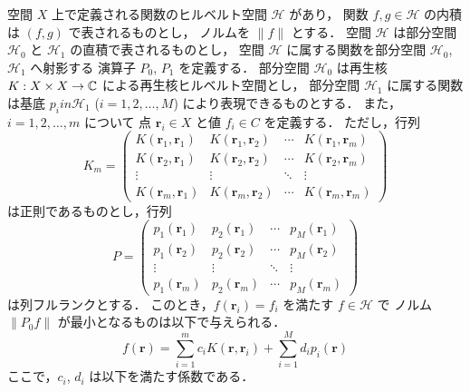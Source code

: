 \begin{theorem}
    空間 $X$ 上で定義される関数のヒルベルト空間 $\mathcal{H}$ があり，
    関数 $f, g \in \mathcal{H}$ の内積は $(f, g)$ で表されるものとし，
    ノルムを $\|f\|$ とする．
    空間 $\mathcal{H}$ は部分空間 $\mathcal{H}_0$ と $\mathcal{H}_1$ の直積で表されるものとし，
    空間 $\mathcal{H}$ に属する関数を部分空間 $\mathcal{H}_0$, $\mathcal{H}_1$ へ射影する
    演算子 $P_0$, $P_1$ を定義する．
    部分空間 $\mathcal{H}_0$ は再生核 $K : X \times X \to \mathbb{C}$ による再生核ヒルベルト空間とし，
    部分空間 $\mathcal{H}_1$ に属する関数は基底 $p_i in \mathcal{H}_1$ ($i = 1, 2, \ldots, M$)
    により表現できるものとする．
    また，$i = 1, 2, \ldots, m$ について
    点 $\bm{r}_i \in X$ と値 $f_i \in C$ を定義する．
    ただし，行列
    \begin{equation}
        K_m =
        \begin{pmatrix}
            K(\bm{r}_1, \bm{r}_1) & K(\bm{r}_1, \bm{r}_2) & \cdots & K(\bm{r}_1, \bm{r}_m) \\
            K(\bm{r}_2, \bm{r}_1) & K(\bm{r}_2, \bm{r}_2) & \cdots & K(\bm{r}_2, \bm{r}_m) \\
            \vdots                & \vdots                & \ddots & \vdots                \\
            K(\bm{r}_m, \bm{r}_1) & K(\bm{r}_m, \bm{r}_2) & \cdots & K(\bm{r}_m, \bm{r}_m)
        \end{pmatrix}
    \end{equation}
    は正則であるものとし，行列
    \begin{equation}
        P =
        \begin{pmatrix}
            p_1(\bm{r}_1) & p_2(\bm{r}_1) & \cdots & p_M(\bm{r}_1) \\
            p_1(\bm{r}_2) & p_2(\bm{r}_2) & \cdots & p_M(\bm{r}_2) \\
            \vdots        & \vdots        & \ddots & \vdots        \\
            p_1(\bm{r}_m) & p_2(\bm{r}_m) & \cdots & p_M(\bm{r}_m)
        \end{pmatrix}
    \end{equation}
    は列フルランクとする．
    このとき，$f(\bm{r}_i) = f_i$ を満たす $f \in \mathcal{H}$ で
    ノルム $\|P_0 f\|$ が最小となるものは以下で与えられる．
    \begin{equation}
        f(\bm{r}) = \sum_{i = 1}^{m} c_i K(\bm{r}, \bm{r}_i) + \sum_{i=1}^M d_i p_i(\bm{r})
    \end{equation}
    ここで，$c_i$, $d_i$ は以下を満たす係数である．

\end{theorem}
